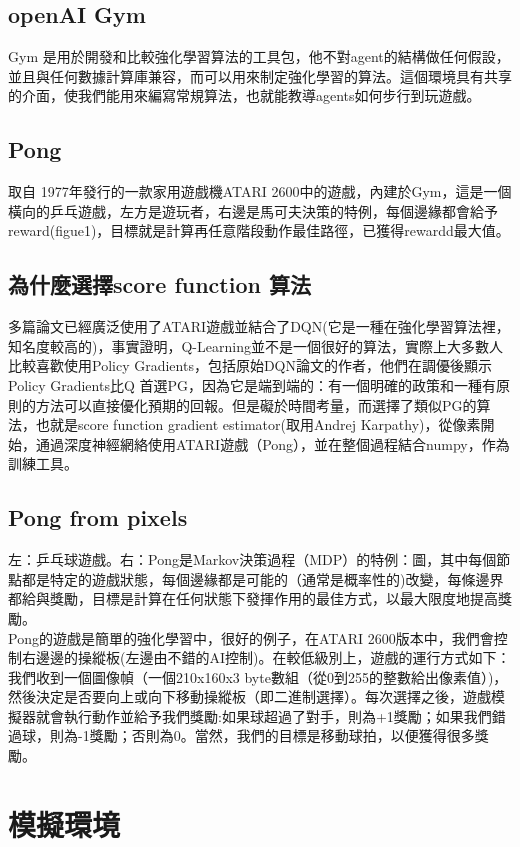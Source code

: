 \documentclass[14pt,a4paper]{report}  %
\begin{document}
\section{openAI Gym}
 Gym 是用於開發和比較強化學習算法的工具包，他不對agent的結構做任何假設，並且與任何數據計算庫兼容，而可以用來制定強化學習的算法。這個環境具有共享的介面，使我們能用來編寫常規算法，也就能教導agents如何步行到玩遊戲。\\[6pt]


\section{Pong}
 取自 1977年發行的一款家用遊戲機ATARI 2600中的遊戲，內建於Gym，這是一個橫向的乒乓遊戲，左方是遊玩者，右邊是馬可夫決策的特例，每個邊緣都會給予reward(figue1)，目標就是計算再任意階段動作最佳路徑，已獲得rewardd最大值。
\section{為什麼選擇score function 算法}
 多篇論文已經廣泛使用了ATARI遊戲並結合了DQN(它是一種在強化學習算法裡，知名度較高的)，事實證明，Q-Learning並不是一個很好的算法，實際上大多數人比較喜歡使用Policy Gradients，包括原始DQN論文的作者，他們在調優後顯示Policy Gradients比Q 首選PG，因為它是端到端的：有一個明確的政策和一種有原則的方法可以直接優化預期的回報。但是礙於時間考量，而選擇了類似PG的算法，也就是score function gradient estimator(取用Andrej Karpathy)，從像素開始，通過深度神經網絡使用ATARI遊戲（Pong），並在整個過程結合numpy，作為訓練工具。


\section{Pong from pixels}
 左：乒乓球遊戲。右：Pong是Markov決策過程（MDP）的特例：圖，其中每個節點都是特定的遊戲狀態，每個邊緣都是可能的（通常是概率性的)改變，每條邊界都給與獎勵，目標是計算在任何狀態下發揮作用的最佳方式，以最大限度地提高獎勵。\\ 
Pong的遊戲是簡單的強化學習中，很好的例子，在ATARI 2600版本中，我們會控制右邊邊的操縱板(左邊由不錯的AI控制)。在較低級別上，遊戲的運行方式如下：我們收到一個圖像幀（一個210x160x3 byte數組（從0到255的整數給出像素值）)，然後決定是否要向上或向下移動操縱板（即二進制選擇）。每次選擇之後，遊戲模擬器就會執行動作並給予我們獎勵:如果球超過了對手，則為+1獎勵；如果我們錯過球，則為-1獎勵；否則為0。當然，我們的目標是移動球拍，以便獲得很多獎勵。\\

\newpage
\chapter{模擬環境}
\end{document}
